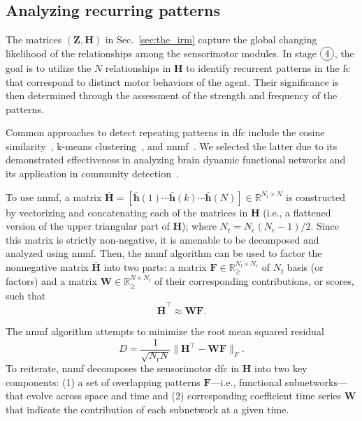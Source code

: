 \subsection{Analyzing recurring patterns}
The matrices $(\bm{Z}, \bm{H})$ in Sec.~\ref{sec:the_irm} capture the global changing likelihood of the relationships among the sensorimotor modules. In stage $\circled{4}$, the goal is to utilize the $N$ relationships in $\bm{H}$ to identify recurrent patterns in the \ac{fc} that correspond to distinct motor behaviors of the agent. Their significance is then determined through the assessment of the strength and frequency of the patterns.

Common approaches to detect repeating patterns in \ac{dfc} include the cosine similarity~\cite{Menon2019comparisonstaticdynamic}, k-means clustering~\cite{Li2017Hightransitionfrequencies}, and \ac{nnmf}~\cite{Fu2019Nonnegativematrixfactorization}. We selected the latter due to its demonstrated effectiveness in analyzing brain dynamic functional networks and its application in community  detection~\cite{Luo2021Symmetricnonnegativematrix}.

To use \ac{nnmf}, a matrix $\bar{\bm{H}} = [\bar{\bm{h}}(1) \cdots \bar{\bm{h}}(k) \cdots \bar{\bm{h}}(N)] \in \mathbb{R}^{N_\text{r}\times N}$ is constructed by vectorizing and concatenating each of the matrices in $\bm{H}$ (i.e., a flattened version of the upper triangular part of $\bm{H}$); where $N_\text{r} = N_\text{c}(N_\text{c}-1)/2$. Since this matrix is strictly non-negative, it is amenable to be decomposed and analyzed using \ac{nnmf}. Then, the \ac{nnmf} algorithm can be used to factor the nonnegative matrix $\bar{\bm{H}}$ into two parts: a matrix $\bm{F} \in \mathbb{R}^{N_\text{f}\times N_\text{r}}_{\geq}$ of $N_\text{f}$ basis (or factors) and a matrix $\bm{W} \in \mathbb{R}^{N\times N_\text{f}}_{\geq}$ of their corresponding contributions, or scores, such that
\begin{equation}
    \bar{\bm{H}}^{\top} \approx \bm{W} \bm{F}.
    \label{eq:nnmf}
\end{equation}

The \ac{nnmf} algorithm attempts to minimize the root mean squared residual 
\begin{equation}    
    D=\dfrac{1}{\sqrt{N_\text{r} N}}\|\bm{H}^{\top}-\bm{W} \bm{F}\|_F.
    \label{eq:residual}
\end{equation}
%
To reiterate, \ac{nnmf} decomposes the sensorimotor \ac{dfc} in $\bm{H}$ into two key components: (1) a set of overlapping patterns $\bm{F}$---i.e., functional subnetworks---that evolve across space and time and (2) corresponding coefficient time series $\bm{W}$ that indicate the contribution of each subnetwork at a given time.

